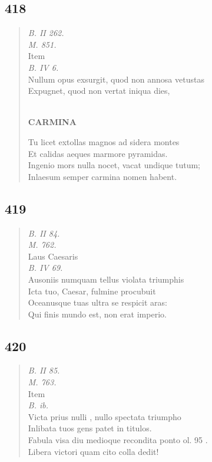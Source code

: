 \documentclass[11pt, a4paper]{report}
\begin{document}
            \subsection*{418}
      \begin{verse}
      \textit{B. II 262.} \\ \textit{M. 851.} \\  \lbrack Item \rbrack  \\ \textit{B. IV 6.} \\ Nullum opus exsurgit, quod non annosa vetustas \\ Expugnet, quod non vertat iniqua dies, \\ 
        ﻿\pagebreak 
    \begin{center} \textbf{CARMINA} \end{center} \marginpar{[324]} Tu licet extollas magnos ad sidera montes \\ Et calidas aeques marmore pyramidas. \\ Ingenio mors nulla nocet, vacat undique tutum; \\ Inlaesum semper carmina nomen habent. \\ 
      \end{verse}
  
            \subsection*{419}
      \begin{verse}
      \textit{B. II 84.} \\ \textit{M. 762.} \\ Laus Caesaris \\ \textit{B. IV 69.} \\ Ausoniis numquam tellus violata triumphis \\ Icta tuo, Caesar, fulmine procubuit \\ Oceanusque tuas ultra se respicit aras: \\ Qui finis mundo est, non erat imperio. \\ 
      \end{verse}
  
            \subsection*{420}
      \begin{verse}
      \textit{B. II 85.} \\ \textit{M. 763.} \\  \lbrack Item \rbrack  \\ \textit{B. ib.} \\ Victa prius  \lbrack nulli \rbrack , nullo spectata triumpho \\ Inlibata tuos gens patet in titulos. \\ Fabula visa diu medioque recondita ponto ol. 95 . \\ Libera victori quam cito colla dedit! \\ 
      \end{verse}
  
\end{document}

